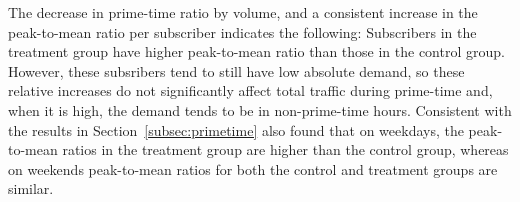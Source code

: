 The decrease in prime-time ratio by volume, and a consistent increase in
the peak-to-mean ratio per subscriber indicates the following:
Subscribers in the treatment group have higher peak-to-mean ratio than
those in the control group. However, these subsribers tend to still have
low absolute demand, so these relative increases do not significantly
affect total traffic during prime-time and, when it is high, the demand
tends to be in non-prime-time hours.  Consistent with the results in
Section~\ref{subsec:primetime} also found that on weekdays, the
peak-to-mean ratios in the treatment group are higher than the control
group, whereas on weekends peak-to-mean ratios for both the control and
treatment groups are similar.
